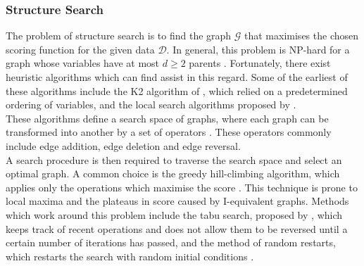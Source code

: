 \documentclass [11pt]{article}
\begin{document}
\subsubsection{Structure Search}\label{StructureSearch}
The problem of structure search is to find the graph $\mathcal{G}$ that maximises the chosen scoring function for the given data $\mathcal{D}$. In general, this problem is NP-hard for a graph whose variables have at most $d\geq 2$ parents \citep{chickering96}. Fortunately, there exist heuristic algorithms which can find assist in this regard. Some of the earliest of these algorithms include the K2 algorithm of \citet{cooper92}, which relied on a predetermined ordering of variables, and the local search algorithms proposed by \citet{heckerman95}.
\\
These algorithms define a search space of graphs, where each graph can be transformed into another by a set of operators \citep{koller09}. These operators commonly include edge addition, edge deletion and edge reversal. 
\\
A search procedure is then required to traverse the search space and select an optimal graph. A common choice is the greedy hill-climbing algorithm, which applies only the operations which maximise the score \citep{koller09}. This technique is prone to local maxima and the plateaus in score caused by I-equivalent graphs. Methods which work around this problem include the tabu search, proposed by \citet{glover86}, which keeps track of recent operations and does not allow them to be reversed until a certain number of iterations has passed, and the method of random restarts, which restarts the search with random initial conditions \citep{koller09}.
\end{document}
